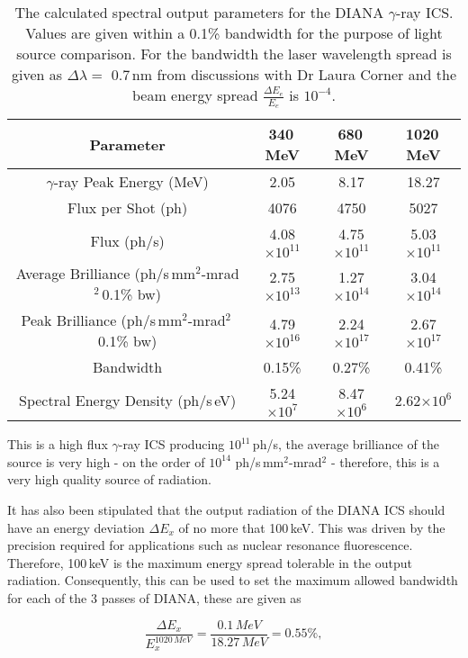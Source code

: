 \documentclass[11pt]{article}
\begin{document}
\begin{table}[H]
\centering
\begin{tabular}{|c||c|c|c|}
\hline
\textbf{Parameter} & \textbf{340\,MeV} & \textbf{680\,MeV} & \textbf{1020\,MeV} \\
\hline
$\gamma$-ray Peak Energy (MeV) & 2.05 & 8.17 & 18.27 \\
\hline
Flux per Shot (ph) & 4076 & 4750 & 5027 \\
\hline
Flux (ph/s) & 4.08$\times 10^{11}$ & 4.75$\times 10^{11}$ & 5.03$\times 10^{11}$ \\
\hline
Average Brilliance (ph/s\,mm$^{2}$-mrad$^{2}$\,0.1\% bw) & 2.75$\times 10^{13}$ & 1.27$\times 10^{14}$ & 3.04$\times 10^{14}$ \\
\hline
Peak Brilliance (ph/s\,mm$^{2}$-mrad$^{2}$\,0.1\% bw) & 4.79$\times 10^{16}$ & 2.24$\times 10^{17}$ & 2.67$\times 10^{17}$ \\
\hline
Bandwidth & 0.15\% & 0.27\% & 0.41\% \\
\hline
Spectral Energy Density (ph/s\,eV) & 5.24$\times 10^{7}$ & 8.47$\times 10^{6}$ & 2.62$\times 10^{6}$ \\
\hline
\end{tabular}
\caption{\label{tab:DIANAout} The calculated spectral output parameters for the DIANA $\gamma$-ray ICS. Values are given within a 0.1\% bandwidth for the purpose of light source comparison. For the bandwidth the laser wavelength spread is given as $\Delta \lambda =$ 0.7\,nm from discussions with Dr Laura Corner and the beam energy spread $\frac{\Delta E_{e}}{E_{e}}$ is $10^{-4}$.}
\end{table}

This is a high flux $\gamma$-ray ICS producing $10^{11}$\,ph/s, the average brilliance of the source is very high - on the order of $10^{14}$ ph/s\,mm$^{2}$-mrad$^{2}$ - therefore, this is a very high quality source of radiation.

It has also been stipulated that the output radiation of the DIANA ICS should have an energy deviation $\Delta E_{x}$ of no more that 100\,keV. This was driven by the precision required for applications such as nuclear resonance fluorescence. Therefore, 100\,keV is the maximum energy spread tolerable in the output radiation. Consequently, this can be used to set the maximum allowed bandwidth for each of the 3 passes of DIANA, these are given as

\begin{equation}
\frac{\Delta E_{x}}{E^{1020\,MeV}_{x}} = \frac{0.1\,MeV}{18.27\,MeV} = 0.55\%,
\label{eq:1020maxband}
\end{equation}  
\end{document}
